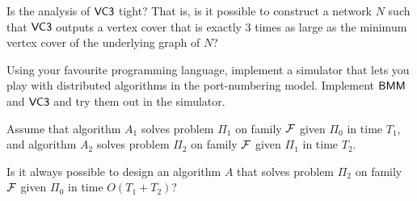\begin{ex}\label{ex:vc3tight}
    Is the analysis of $\textsf{VC3}$ tight? That is, is it possible to construct a network $N$ such that $\textsf{VC3}$ outputs a vertex cover that is exactly $3$ times as large as the minimum vertex cover of the underlying graph of $N$?
\end{ex}

\begin{ex}[implementation]\label{ex:simulator}
    Using your favourite programming language, implement a simulator that lets you play with distributed algorithms in the port-numbering model. Implement $\textsf{BMM}$ and $\textsf{VC3}$ and try them out in the simulator.
\end{ex}

\begin{ex}[composition]\label{ex:composition}
    Assume that algorithm $A_1$ solves problem $\Pi_1$ on family $\mathcal{F}$ given $\Pi_0$ in time $T_1$, and algorithm $A_2$ solves problem $\Pi_2$ on family $\mathcal{F}$ given $\Pi_1$ in time $T_2$.
    
    Is it always possible to design an algorithm $A$ that solves problem $\Pi_2$ on family $\mathcal{F}$ given $\Pi_0$ in time $O(T_1 + T_2)$?
    
\end{ex}
